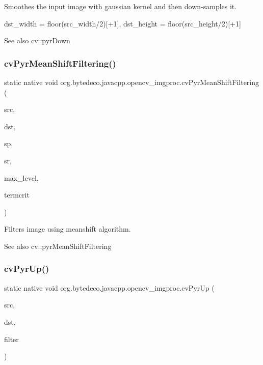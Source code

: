 Smoothes the input image with gaussian kernel and then down-\/samples it. 

dst\+\_\+width = floor(src\+\_\+width/2)\mbox{[}+1\mbox{]}, dst\+\_\+height = floor(src\+\_\+height/2)\mbox{[}+1\mbox{]} \begin{DoxySeeAlso}{See also}
cv\+::pyr\+Down 
\end{DoxySeeAlso}
\mbox{\label{group__imgproc__c_ga03ca86df80599c20db2980fb4a3eeed2}} 
\subsubsection{\texorpdfstring{cv\+Pyr\+Mean\+Shift\+Filtering()}{cvPyrMeanShiftFiltering()}}
{\footnotesize\ttfamily static native void org.\+bytedeco.\+javacpp.\+opencv\+\_\+imgproc.\+cv\+Pyr\+Mean\+Shift\+Filtering (\begin{DoxyParamCaption}\item[{@Const Cv\+Arr}]{src,  }\item[{Cv\+Arr}]{dst,  }\item[{double}]{sp,  }\item[{double}]{sr,  }\item[{int}]{max\+\_\+level,  }\item[{@By\+Val(null\+Value=\char`\"{}Cv\+Term\+Criteria(cv\+Term\+Criteria(C\+V\+\_\+\+T\+E\+R\+M\+C\+R\+I\+T\+\_\+\+I\+T\+ER+C\+V\+\_\+\+T\+E\+R\+M\+C\+R\+I\+T\+\_\+\+E\+PS,5,1))\char`\"{}) Cv\+Term\+Criteria}]{termcrit }\end{DoxyParamCaption})\hspace{0.3cm}{\ttfamily [static]}}



Filters image using meanshift algorithm. 

\begin{DoxySeeAlso}{See also}
cv\+::pyr\+Mean\+Shift\+Filtering 
\end{DoxySeeAlso}
\mbox{\label{group__imgproc__c_ga08b1a7b3bf0f0c133345b307e6dfa952}} 
\subsubsection{\texorpdfstring{cv\+Pyr\+Up()}{cvPyrUp()}}
{\footnotesize\ttfamily static native void org.\+bytedeco.\+javacpp.\+opencv\+\_\+imgproc.\+cv\+Pyr\+Up (\begin{DoxyParamCaption}\item[{@Const Cv\+Arr}]{src,  }\item[{Cv\+Arr}]{dst,  }\item[{int}]{filter }\end{DoxyParamCaption})\hspace{0.3cm}{\ttfamily [static]}}



